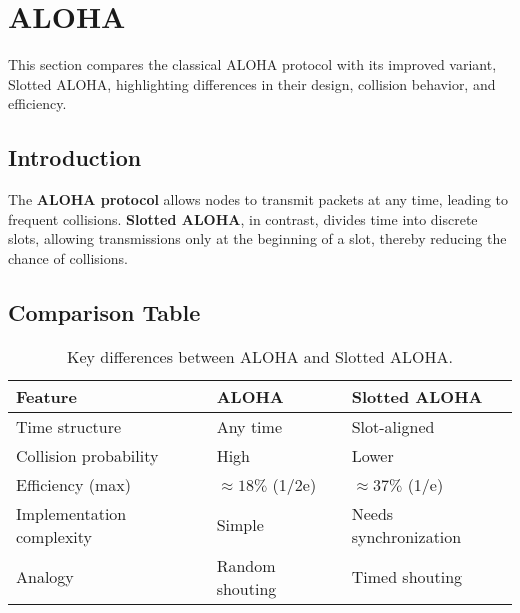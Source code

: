 \documentclass[../../../OAE-SPEC-MAIN.tex]{subfiles}
\begin{document}
\section{ALOHA}

This section compares the classical ALOHA protocol with its improved variant, Slotted ALOHA, highlighting differences in their design, collision behavior, and efficiency.

\subsection{Introduction}

The \textbf{ALOHA protocol} allows nodes to transmit packets at any time, leading to frequent collisions. 
\textbf{Slotted ALOHA}, in contrast, divides time into discrete slots, allowing transmissions only at the beginning of a slot, thereby reducing the chance of collisions.

\cite{Abramson1970, Kleinrock1975}


\subsection{Comparison Table}

\begin{table}[h]
\centering
\begin{tabular}{@{}lll@{}}
\toprule
\textbf{Feature} & \textbf{ALOHA} & \textbf{Slotted ALOHA} \\
\midrule
Time structure & Any time & Slot-aligned \\
Collision probability & High & Lower \\
Efficiency (max) & $\approx 18\%$ (1/2e) & $\approx 37\%$ (1/e) \\
Implementation complexity & Simple & Needs synchronization \\
Analogy & Random shouting & Timed shouting \\
\bottomrule
\end{tabular}
\caption{Key differences between ALOHA and Slotted ALOHA.}
\end{table}
\end{document}
